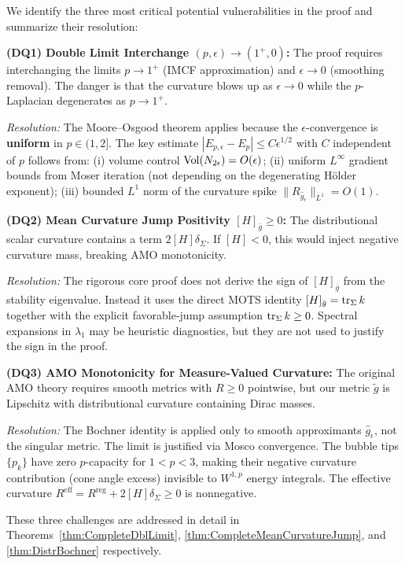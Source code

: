 \begin{remark}\label{rem:ThreeDangerousQuestions}
We identify the three most critical potential vulnerabilities in the proof and summarize their resolution:

\textbf{(DQ1) Double Limit Interchange $(p,\epsilon) \to (1^+, 0)$:}
The proof requires interchanging the limits $p \to 1^+$ (IMCF approximation) and $\epsilon \to 0$ (smoothing removal). The danger is that the curvature blows up as $\epsilon \to 0$ while the $p$-Laplacian degenerates as $p \to 1^+$. 

\emph{Resolution:} The Moore--Osgood theorem applies because the $\epsilon$-convergence is \textbf{uniform} in $p \in (1,2]$. The key estimate $|E_{p,\epsilon} - E_p| \le C\epsilon^{1/2}$ with $C$ independent of $p$ follows from: (i) volume control $\operatorname{Vol}(N_{2\epsilon}) = O(\epsilon)$; (ii) uniform $L^\infty$ gradient bounds from Moser iteration (not depending on the degenerating H\"older exponent); (iii) bounded $L^1$ norm of the curvature spike $\|R_{\hat{g}_\epsilon}\|_{L^1} = O(1)$.

\textbf{(DQ2) Mean Curvature Jump Positivity $[H]_{\bar{g}} \ge 0$:}
The distributional scalar curvature contains a term $2[H]\delta_\Sigma$. If $[H] < 0$, this would inject negative curvature mass, breaking AMO monotonicity.

\emph{Resolution:} The rigorous core proof does not derive the sign of $[H]_{\bar{g}}$ from the stability eigenvalue. Instead it uses the direct MOTS identity $[H]_{\bar{g}} = \operatorname{tr}_\Sigma k$ together with the explicit favorable-jump assumption $\operatorname{tr}_\Sigma k \ge 0$. Spectral expansions in $\lambda_1$ may be heuristic diagnostics, but they are not used to justify the sign in the proof.

\textbf{(DQ3) AMO Monotonicity for Measure-Valued Curvature:}
The original AMO theory requires smooth metrics with $R \ge 0$ pointwise, but our metric $\tilde{g}$ is Lipschitz with distributional curvature containing Dirac masses.

\emph{Resolution:} The Bochner identity is applied only to smooth approximants $\hat{g}_\epsilon$, not the singular metric. The limit is justified via Mosco convergence. The bubble tips $\{p_k\}$ have zero $p$-capacity for $1 < p < 3$, making their negative curvature contribution (cone angle excess) invisible to $W^{1,p}$ energy integrals. The effective curvature $R^{\text{eff}} = R^{\text{reg}} + 2[H]\delta_\Sigma \ge 0$ is nonnegative.

These three challenges are addressed in detail in Theorems~\ref{thm:CompleteDblLimit}, \ref{thm:CompleteMeanCurvatureJump}, and \ref{thm:DistrBochner} respectively.
\end{remark}

